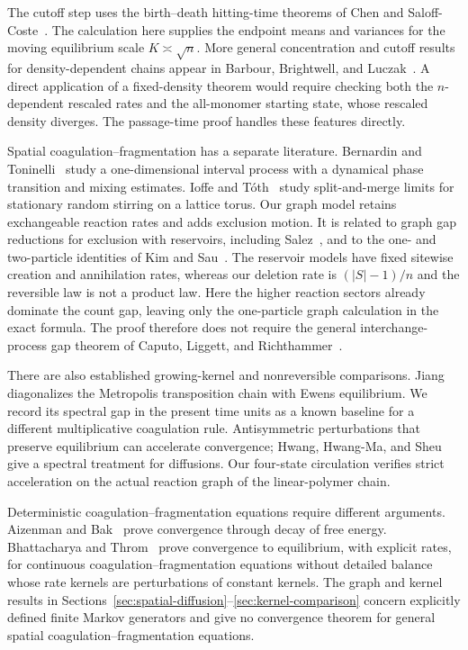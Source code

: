 The cutoff step uses the birth--death hitting-time theorems of Chen
and Saloff-Coste~\cite{CSC2015}. The calculation here supplies the
endpoint means and variances for the moving equilibrium scale
$K\asymp\sqrt n$. More general concentration and cutoff results for
density-dependent chains appear in Barbour, Brightwell, and
Luczak~\cite{BBL2022,BBL2026}. A direct application of a
fixed-density theorem would require checking both the
$n$-dependent rescaled rates and the all-monomer starting state,
whose rescaled density diverges. The passage-time proof handles
these features directly.

Spatial coagulation--fragmentation has a separate literature.
Bernardin and Toninelli~\cite{BernardinToninelli2012} study a
one-dimensional interval process with a dynamical phase transition
and mixing estimates. Ioffe and T\'oth~\cite{IoffeToth2020} study
split-and-merge limits for stationary random stirring on a lattice
torus. Our graph model retains exchangeable
reaction rates and adds exclusion motion. It is related to graph
gap reductions for exclusion with reservoirs, including
Salez~\cite{Salez2023,Salez2024}, and to the one- and two-particle
identities of Kim and Sau~\cite{KimSau2026}. The reservoir models
have fixed sitewise creation and annihilation rates, whereas our
deletion rate is $(|S|-1)/n$ and the reversible law is not a product
law. Here the higher reaction sectors already dominate the count
gap, leaving only the one-particle graph calculation in the exact
formula. The proof therefore does not require the general
interchange-process gap theorem of Caputo, Liggett, and
Richthammer~\cite{CaputoLiggettRichthammer2010}.

There are also established growing-kernel and nonreversible
comparisons. Jiang~\cite{Jiang2015} diagonalizes the Metropolis
transposition chain with Ewens equilibrium. We record its spectral
gap in the present time units as a known baseline for a different
multiplicative coagulation rule. Antisymmetric perturbations that
preserve equilibrium can accelerate convergence; Hwang, Hwang-Ma,
and Sheu~\cite{HwangHwangMaSheu2005} give a spectral treatment for
diffusions. Our four-state circulation verifies strict acceleration
on the actual reaction graph of the linear-polymer chain.

Deterministic coagulation--fragmentation equations require different
arguments. Aizenman and Bak~\cite{AizenmanBak1979} prove convergence
through decay of free energy. Bhattacharya and
Throm~\cite{BhattacharyaThrom2026} prove convergence to equilibrium,
with explicit rates, for continuous coagulation--fragmentation
equations without detailed balance whose rate kernels are
perturbations of constant kernels. The graph and kernel results in
Sections~\ref{sec:spatial-diffusion}--\ref{sec:kernel-comparison}
concern explicitly defined finite Markov generators and give no
convergence theorem for general spatial coagulation--fragmentation
equations.
